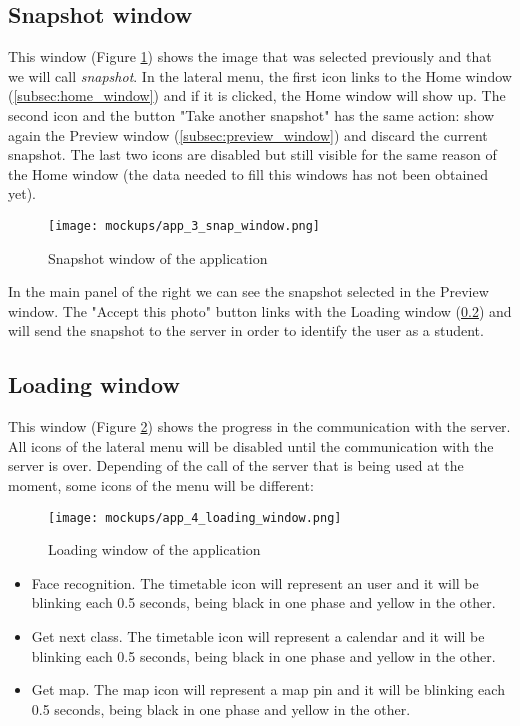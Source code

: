	\subsection{Snapshot window}
	\label{subsec:snapshot_window}
	This window (Figure \ref{fig:snap_window}) shows the image that was selected previously and that we will call \textit{\gls{snapshot}}. In the lateral menu, the first icon links to the Home window (\ref{subsec:home_window}) and if it is clicked, the Home window will show up. The second icon and the button "Take another snapshot" has the same action: show again the Preview window (\ref{subsec:preview_window}) and discard the current snapshot. The last two icons are disabled but still visible for the same reason of the Home window (the data needed to fill this windows has not been obtained yet).

	\begin{figure}[!ht]
		\centering
		\texttt{[image: mockups/app\_3\_snap\_window.png]}
		\caption{Snapshot window of the application}
		\label{fig:snap_window}
	\end{figure}

	\clearpage

	In the main panel of the right we can see the snapshot selected in the Preview window. The "Accept this photo" button links with the Loading window (\ref{subsec:loading_window}) and will send the snapshot to the server in order to identify the user as a student.

	\subsection{Loading window}
	\label{subsec:loading_window}
	This window (Figure \ref{fig:loading_window}) shows the progress in the communication with the server. All icons of the lateral menu will be disabled until the communication with the server is over. Depending of the call of the server that is being used at the moment, some icons of the menu will be different:

	\begin{figure}[!ht]
		\centering
		\texttt{[image: mockups/app\_4\_loading\_window.png]}
		\caption{Loading window of the application}
		\label{fig:loading_window}
	\end{figure}

	\begin{itemize}
		\item Face recognition. The timetable icon will represent an user and it will be blinking each 0.5 seconds, being black in one phase and yellow in the other. 
		\item Get next class. The timetable icon will represent a calendar and it will be blinking each 0.5 seconds, being black in one phase and yellow in the other.
		\item Get map. The map icon will represent a map pin and it will be blinking each 0.5 seconds, being black in one phase and yellow in the other.
	\end{itemize}

